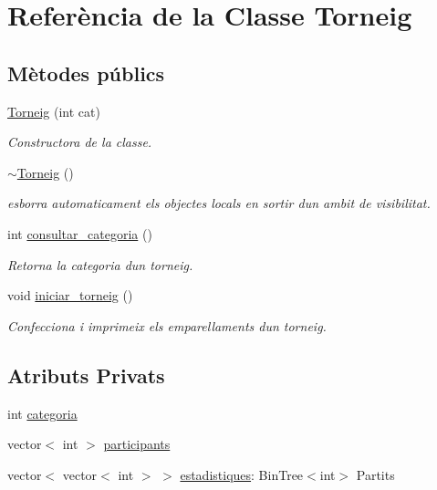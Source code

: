 \hypertarget{class_torneig}{}\section{Referència de la Classe Torneig}
\label{class_torneig}
\subsection*{Mètodes públics}
\begin{DoxyCompactItemize}
\item 
\mbox{\hyperlink{class_torneig_a9794723939612dccda9f9a3979789b11}{Torneig}} (int cat)
\begin{DoxyCompactList}\small\item\em Constructora de la classe. \end{DoxyCompactList}\item 
\mbox{\hyperlink{class_torneig_ab5184085575669dd522e11a25f602943}{$\sim$\+Torneig}} ()
\begin{DoxyCompactList}\small\item\em esborra automaticament els objectes locals en sortir d\textquotesingle{}un ambit de visibilitat. \end{DoxyCompactList}\item 
int \mbox{\hyperlink{class_torneig_a78a82b011e01b5d07ade6378da916c3c}{consultar\+\_\+categoria}} ()
\begin{DoxyCompactList}\small\item\em Retorna la categoria d\textquotesingle{}un torneig. \end{DoxyCompactList}\item 
void \mbox{\hyperlink{class_torneig_aef12c108d9872a53f8a54f03135c7344}{iniciar\+\_\+torneig}} ()
\begin{DoxyCompactList}\small\item\em Confecciona i imprimeix els emparellaments d\textquotesingle{}un torneig. \end{DoxyCompactList}\end{DoxyCompactItemize}
\subsection*{Atributs Privats}
\begin{DoxyCompactItemize}
\item 
int \mbox{\hyperlink{class_torneig_a8a80ab41ebab7d88a2569247c6ec4c81}{categoria}}
\item 
vector$<$ int $>$ \mbox{\hyperlink{class_torneig_a7146b542f678d15c1847f9ec57c866bf}{participants}}
\item 
vector$<$ vector$<$ int $>$ $>$ \mbox{\hyperlink{class_torneig_afb270c579c18c46261a52122fb152942}{estadistiques}}\+: Bin\+Tree$<$int$>$ Partits
\end{DoxyCompactItemize}


